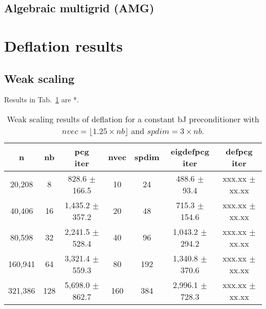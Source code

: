 \documentclass{article}
\begin{document}
\subsection{Algebraic multigrid (AMG)}

\section{Deflation results}

\subsection{Weak scaling}
Results in Tab.~\ref{Tab:005} are *.





\begin{table}[ht]
	\caption{Weak scaling results of deflation for a constant bJ preconditioner with $nvec=\lfloor1.25\times nb\rfloor$ and $spdim=3\times nb$.}
	\centering
	\begin{tabular}{|c|c|c|c|c|c|c|}
		\hline
		n & nb & \makecell{pcg\\ iter} & nvec & spdim & \makecell{eigdefpcg\\ iter} & \makecell{defpcg\\ iter}\\
		\hline
		20,208  &   8 &   828.6 $\pm$ 166.5 &  10 &  24 &   488.6 $\pm$  93.4 & xxx.xx $\pm$ xx.xx \\
		40,406  &  16 & 1,435.2 $\pm$ 357.2 &  20 &  48 &   715.3 $\pm$ 154.6 & xxx.xx $\pm$ xx.xx \\
		80,598  &  32 & 2,241.5 $\pm$ 528.4 &  40 &  96 & 1,043.2 $\pm$ 294.2 & xxx.xx $\pm$ xx.xx \\
		160,941 &  64 & 3,321.4 $\pm$ 559.3 &  80 & 192 & 1,340.8 $\pm$ 370.6 & xxx.xx $\pm$ xx.xx \\
		321,386 & 128 & 5,698.0 $\pm$ 862.7 & 160 & 384 & 2,996.1 $\pm$ 728.3 & xxx.xx $\pm$ xx.xx \\
		\hline
	\end{tabular}
	\label{Tab:005}
\end{table}
\end{document}
